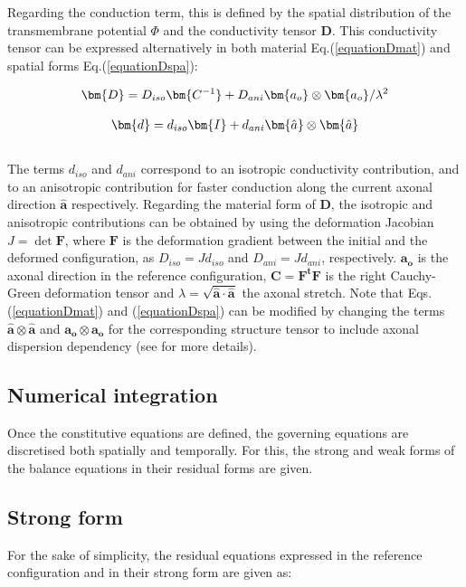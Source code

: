 \documentclass[oneside,11pt,times]{book}
\begin{document}
Regarding the conduction term, this is defined by the spatial distribution of the transmembrane potential $\Phi$ and the conductivity tensor $\bm{D}$. This conductivity tensor can be expressed alternatively in both material Eq.(\ref{equationDmat}) and spatial forms Eq.(\ref{equationDspa}):

\begin{equation}
\begin{aligned}
\centering
\bm{D}=D_{iso}\bm{C^{-1}}+D_{ani}\bm{a_{o}}\otimes\bm{a_{o}}/\lambda^{2}
\end{aligned}
\label{equationDmat}
\end{equation}

\begin{equation}
\begin{aligned}
\centering
\bm{d}=d_{iso}\bm{I}+d_{ani}\bm{\hat{a}}\otimes\bm{\hat{a}}
\end{aligned}
\label{equationDspa}
\end{equation}
\\
The terms $d_{iso}$ and $d_{ani}$ correspond to an isotropic conductivity contribution, and to an anisotropic contribution for faster conduction along the current axonal direction $\bm{\hat{a}}$ respectively. Regarding the material form of $\bm{D}$, the isotropic and anisotropic contributions can be obtained by using the deformation Jacobian $J=\det{\bm{F}}$, where $\bm{F}$ is the deformation gradient between the initial and the deformed configuration, as $D_{iso}=Jd_{iso}$ and $D_{ani}=Jd_{ani}$, respectively. $\bm{a_{o}}$ is the axonal direction in the reference configuration, $\bm{C}=\bm{F^{t}}\bm{F}$ is the right Cauchy-Green deformation tensor and $\lambda=\sqrt{\bm{\hat{a}}\cdot\bm{\hat{a}}}$ the axonal stretch. Note that Eqs.(\ref{equationDmat}) and (\ref{equationDspa}) can be modified by changing the terms $\bm{\hat{a}}\otimes\bm{\hat{a}}$ and $\bm{a_{o}}\otimes\bm{a_{o}}$ for the corresponding structure tensor to include axonal dispersion dependency (see \citep{garciajeru:2018} for more details).

\subsection{Numerical integration}
Once the constitutive equations are defined, the governing equations are discretised both spatially and temporally. For this, the strong and weak forms of the balance equations in their residual forms are given.

\subsection{Strong form}
For the sake of simplicity, the residual equations expressed in the reference configuration and in their strong form are given as:
\end{document}
